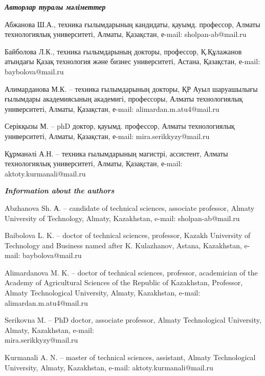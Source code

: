 \begin{authorinfo}
\emph{{\bfseries Авторлар туралы мәліметтер}}  

Абжанова Ш.А., техника ғылымдарының кандидаты, қауымд. профессор,
Алматы технологиялық университеті, Алматы, Қазақстан, е-mail:
sholpan-ab@mail.ru

Байболова Л.К., техника ғылымдарының докторы, профессор, Қ.Құлажанов
атындағы Қазақ технология және бизнес университеті, Астана, Қазақстан,
е-mail: baybolova@mail.ru

Алимарданова М.К. – техника ғылымдарының докторы, ҚР Ауыл шаруашылығы
ғылымдары академиясының академигі, профессоры, Алматы технологиялық
университеті, Алматы, Қазақстан, е-mail: alimardan.m.atu4@mail.ru

Серікқызы М. – phD доктор, қауымд. профессор, Алматы технологиялық
университеті, Алматы, Қазақстан, е-mail: mira.serikkyzy@mail.ru

Құрманәлі А.Н. – техника ғылымдарының магистрі, ассистент, Алматы
технологиялық университеті, Алматы, Қазақстан, е-mail:
aktoty.kurmanali@mail.ru

\emph{{\bfseries Information about the authors}}  

Abzhanova Sh. А. – candidate of technical sciences, associate
professor, Almaty University of Technology, Almaty, Kazakhstan,
e-mail: sholpan-ab@mail.ru

Baibolova L. K. – doctor of technical sciences, professor, Kazakh
University of Technology and Business named after K. Kulazhanov,
Astana, Kazakhstan, e-mail: baybolova@mail.ru

Alimardanova M. K. – doctor of technical sciences, professor,
academician of the Academy of Agricultural Sciences of the Republic of
Kazakhstan, Professor, Almaty Technological University, Almaty,
Kazakhstan, e-mail: alimardan.m.atu4@mail.ru

Serikovna M. – PhD doctor, associate professor, Almaty Technological
University, Almaty, Kazakhstan, e-mail: \\mira.serikkyzy@mail.ru

Kurmanali A. N. – master of technical sciences, assistant, Almaty
Technological University, Almaty, Kazakhstan, e-mail:
aktoty.kurmanali@mail.ru
\end{authorinfo}
